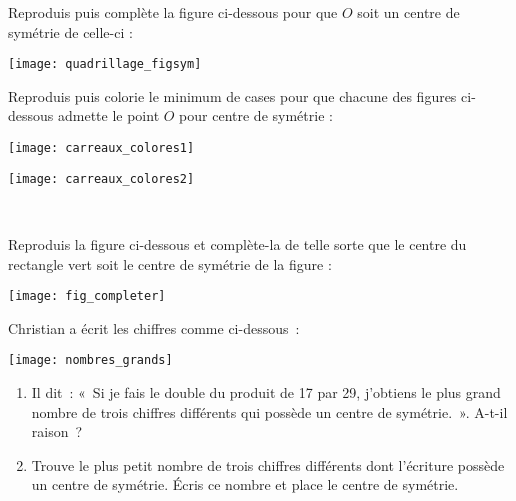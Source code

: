 \begin{exercice}
Reproduis puis complète la figure ci-dessous pour que $O$ soit un centre de symétrie de celle-ci :
 \begin{center} \texttt{[image: quadrillage\_figsym]} \end{center}
\end{exercice}


\begin{exercice}
Reproduis puis colorie le minimum de cases pour que chacune des figures ci-dessous admette le point $O$ pour centre de symétrie :

\begin{minipage}[c]{0.48\linewidth}
\texttt{[image: carreaux\_colores1]}
 \end{minipage} \hfill%
\begin{minipage}[c]{0.48\linewidth}
 \texttt{[image: carreaux\_colores2]}
 \end{minipage} \\

\end{exercice}


\begin{exercice}
Reproduis la figure ci-dessous et complète-la de telle sorte que le centre du rectangle vert soit le centre de symétrie de la figure :
 \begin{center} \texttt{[image: fig\_completer]} \end{center}
\end{exercice}


\begin{exercice}
Christian a écrit les chiffres comme ci-dessous :
 \begin{center} \texttt{[image: nombres\_grands]} \end{center}
 \begin{enumerate}
  \item Il dit : « Si je fais le double du produit de 17 par 29, j'obtiens le plus grand nombre de trois chiffres différents qui possède un centre de symétrie. ». A-t-il raison ? 
  \item Trouve le plus petit nombre de trois chiffres différents dont l'écriture possède un centre de symétrie. Écris ce nombre et place le centre de symétrie.
  \end{enumerate}
\end{exercice}



